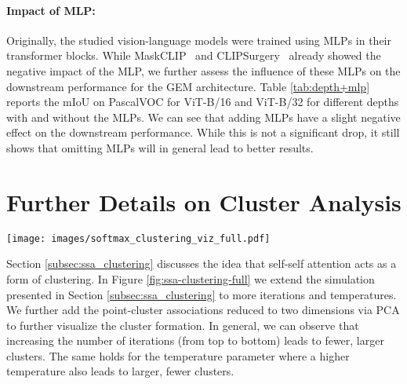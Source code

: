 \documentclass[10pt,twocolumn,letterpaper]{article}
\begin{document}
\paragraph{Impact of MLP:}
Originally, the studied vision-language models were trained using MLPs in their transformer blocks. While MaskCLIP~\citep{dong2023maskclip} and CLIPSurgery~\citep{li2023clipsurgery} already showed the negative impact of the MLP,  we further assess the influence of these MLPs on the downstream performance for the GEM architecture.
Table \ref{tab:depth+mlp} reports the mIoU on PascalVOC for ViT-B/16 and ViT-B/32 for different depths with and without the MLPs. We can see that adding MLPs have a slight negative effect on the downstream performance. While this is not a significant drop, it still shows that omitting MLPs will in general lead to better results.


\section{Further Details on Cluster Analysis} \label{appendix:analysis}

\begin{figure*}\centering
    \vspace{-1em}
\texttt{[image: images/softmax\_clustering\_viz\_full.pdf]}
    \vspace{-1.5em}
    \caption{
    Visualization of self-self attention on a set of 20 vectors: In the top 3 rows, a set of 20 vectors undergoing self-self attention for iterations $K=\{3, 10, 30\}$  and temperatures $\tau=\{0.07, 0.1, 0.13, 0.18\}$. Displayed are the 20 data points (reduced to two dimensions via PCA) and their color represents a smooth cluster membership (the vector into which they are transformed is translated into a color value.) We further show the attention matrix for each configuration (the points were manually ordered for visual simplicity.) 
    It shows that as the number of iterations and/or the temperature increases, self-self attention produces larger fewer clusters.}
    \label{fig:ssa-clustering-full}
    \vspace{-1em}
\end{figure*}

Section \ref{subsec:ssa_clustering} discusses the idea that self-self attention acts as a form of clustering. In Figure \ref{fig:ssa-clustering-full} we extend the simulation presented in Section \ref{subsec:ssa_clustering} to more iterations and temperatures. We further add the point-cluster associations reduced to two dimensions via PCA to further visualize the cluster formation. In general, we can observe that increasing the number of iterations (from top to bottom) leads to fewer, larger clusters. The same holds for the temperature parameter where a higher temperature also leads to larger, fewer clusters.  
\end{document}
